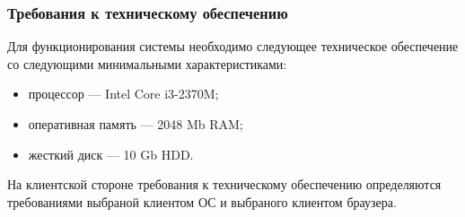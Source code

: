 \subsubsection{Требования к техническому обеспечению}


Для функционирования системы необходимо следующее техническое обеспечение со следующими минимальными характеристиками:
\begin{itemize}
\item процессор --– Intel Core i3-2370M;
\item оперативная память --– 2048 Mb RAM;
\item жесткий диск --- 10 Gb HDD.
\end{itemize}

На клиентской стороне требования к техническому обеспечению определяются требованиями выбраной клиентом ОС и выбраного клиентом браузера.
